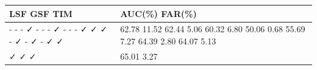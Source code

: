 \begin{tabular}{ll}
\toprule
LSF GSF TIM & AUC(\%) FAR(\%) \\
\midrule
- - - ✓ - - - ✓ - - - ✓ ✓ ✓ - ✓ - ✓ - ✓ ✓ & 62.78 11.52 62.44 5.06 60.32 6.80 50.06 0.68 55.69 7.27 64.39 2.80 64.07 5.13 \\
✓ ✓ ✓ & 65.01 3.27 \\
\bottomrule
\end{tabular}

